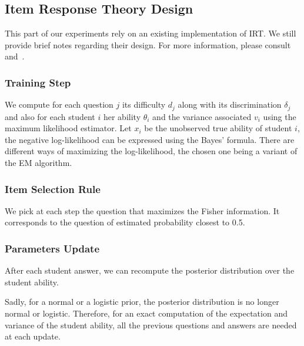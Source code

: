 \documentclass{sig-alternate}
\begin{document}

\subsection{Item Response Theory Design}

This part of our experiments rely on an existing implementation of IRT. We still provide brief notes regarding their design. For more information, please consult \citep{Rizopoulos2006} and~\citep{MagisRaiche2012}.

\subsubsection{Training Step}

We compute for each question $j$ its difficulty $d_j$ along with its discrimination $\delta_j$ and also for each student $i$ her ability $\theta_i$ and the variance associated $v_i$ using the maximum likelihood estimator. Let $x_i$ be the unobserved true ability of student $i$, the negative log-likelihood can be expressed using the Bayes' formula. There are different ways of maximizing the log-likelihood, the chosen one being a variant of the EM algorithm.

\subsubsection{Item Selection Rule}

We pick at each step the question that maximizes the Fisher information. It corresponds to the question of estimated probability closest to 0.5. %

\subsubsection{Parameters Update}

After each student answer, we can recompute the posterior distribution over the student ability.

Sadly, for a normal or a logistic prior, the posterior distribution is no longer normal or logistic. Therefore, for an exact computation of the expectation and variance of the student ability, all the previous questions and answers are needed at each update.
\end{document}
